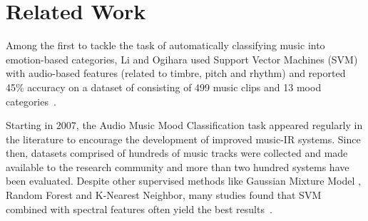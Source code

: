 \documentclass{llncs}
\begin{document}



\section{Related Work}

Among the first to tackle the task of automatically classifying music into emotion-based categories, Li and Ogihara used Support Vector Machines (SVM) with audio-based features (related to timbre, pitch and rhythm) and reported 45\% accuracy on a dataset of consisting of 499 music clips and 13 mood categories~\cite{DBLP:conf/ismir/LiM03}.



Starting in 2007, the Audio Music Mood Classification task appeared regularly in the literature to encourage the development of improved music-IR systems. Since then, datasets comprised of hundreds of music tracks were collected and made available to the research community and more than two hundred systems have been evaluated. Despite other supervised methods like Gaussian Mixture Model \cite{DBLP:journals/taslp/LuLZ06}, Random Forest and K-Nearest Neighbor, many studies found that SVM combined with spectral features often yield the best results~\cite{Yang2012Machine}.
\end{document}
